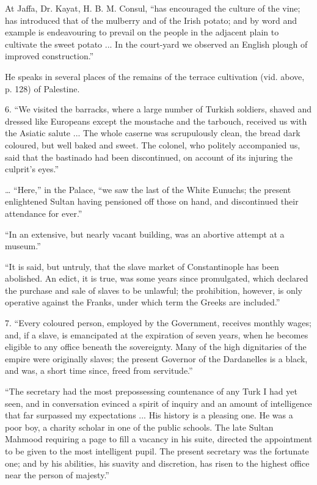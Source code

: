 At Jaffa, Dr. Kayat, H. B. M.
Consul, ``has encouraged the culture of the vine; has introduced that
of the mulberry and of the Irish potato; and by word and example is
endeavouring to prevail on the people in the adjacent plain to
cultivate the sweet potato ... In the court-yard we observed an
English plough of improved construction.''

He speaks in several places of
the remains of the terrace cultivation (vid. above, p. 128) of
Palestine.

6. ``We visited the barracks,
where a large number of Turkish soldiers, shaved and dressed like
Europeans except the moustache and the tarbouch, received us with the
Asiatic salute ... The whole caserne was scrupulously clean, the bread
dark coloured, but well baked and sweet. The colonel, who politely
accompanied us, said that the bastinado had been discontinued, on
account of its injuring the culprit's eyes.''

… ``Here,'' in the Palace, ``we
saw the last of the White Eunuchs; the present enlightened Sultan
having pensioned off those on hand, and discontinued their attendance
for ever.''

``In
an extensive, but nearly vacant building, was an abortive attempt at a
museum.''

``It
is said, but untruly, that the slave market of Constantinople has been
abolished. An edict, it is true, was some years since promulgated,
which declared the purchase and sale of slaves to be unlawful; the
prohibition, however, is only operative against the Franks, under
which term the Greeks are included.''

7. ``Every coloured person,
employed by the Government, receives monthly wages; and, if a slave,
is emancipated at the expiration of seven years, when he becomes
eligible to any office beneath the sovereignty. Many of the high
dignitaries of the empire were originally slaves; the present Governor
of the Dardanelles is a black, and was, a short time since, freed from
servitude.''

``The
secretary had the most prepossessing countenance of any Turk I had yet
seen, and in conversation evinced a spirit of inquiry and an
amount of intelligence that far surpassed my expectations ... His
history is a pleasing one. He was a poor boy, a charity scholar in one
of the public schools. The late Sultan Mahmood requiring a page to
fill a vacancy in his suite, directed the appointment to be given to
the most intelligent pupil. The present secretary was the fortunate
one; and by his abilities, his suavity and discretion, has risen to
the highest office near the person of majesty.''


